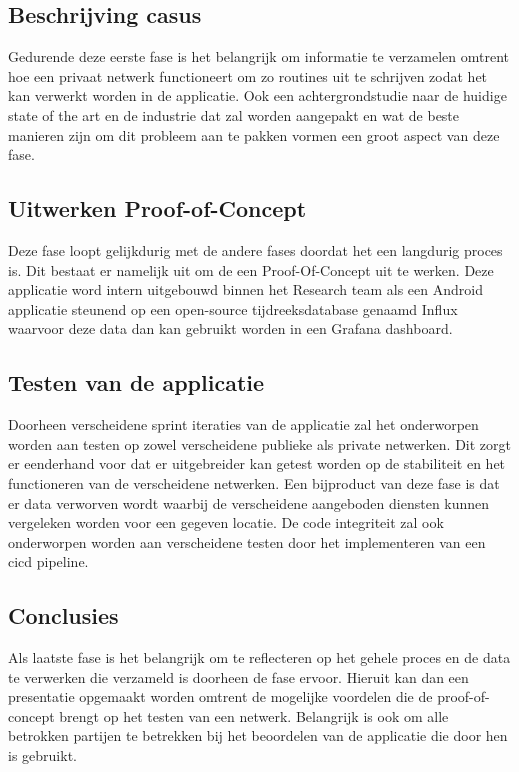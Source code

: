 \subsection{Beschrijving casus}
\label{subsub:beschrijving}

Gedurende deze eerste fase is het belangrijk om informatie te verzamelen omtrent hoe een privaat netwerk functioneert om zo routines uit te schrijven zodat het kan verwerkt worden in de applicatie. Ook een achtergrondstudie naar de huidige state of the art en de industrie dat zal worden aangepakt en wat de beste manieren zijn om dit probleem aan te pakken vormen een groot aspect van deze fase. \\

\subsection{Uitwerken Proof-of-Concept}
\label{subsub:uitwerking}

Deze fase loopt gelijkdurig met de andere fases doordat het een langdurig proces is. Dit bestaat er namelijk uit om de een Proof-Of-Concept uit te werken. Deze applicatie word intern uitgebouwd binnen het Research team als een Android applicatie steunend op een open-source tijdreeksdatabase genaamd Influx waarvoor deze data dan kan gebruikt worden in een Grafana dashboard.

\subsection{Testen van de applicatie}
\label{subsub:testfase}

Doorheen verscheidene sprint iteraties van de applicatie zal het onderworpen worden aan testen op zowel verscheidene publieke als private netwerken. Dit zorgt er eenderhand voor dat er uitgebreider kan getest worden op de stabiliteit en het functioneren van de verscheidene netwerken. Een bijproduct van deze fase is dat er data verworven wordt waarbij de verscheidene aangeboden diensten kunnen vergeleken worden voor een gegeven locatie. De code integriteit zal ook onderworpen worden aan verscheidene testen door het implementeren van een cicd pipeline.

\subsection{Conclusies}
\label{subsub:conclusies}

Als laatste fase is het belangrijk om te reflecteren op het gehele proces en de data te verwerken die verzameld is doorheen de fase ervoor. Hieruit kan dan een presentatie opgemaakt worden omtrent de mogelijke voordelen die de proof-of-concept brengt op het testen van een netwerk. Belangrijk is ook om alle betrokken partijen te betrekken bij het beoordelen van de applicatie die door hen is gebruikt. 



